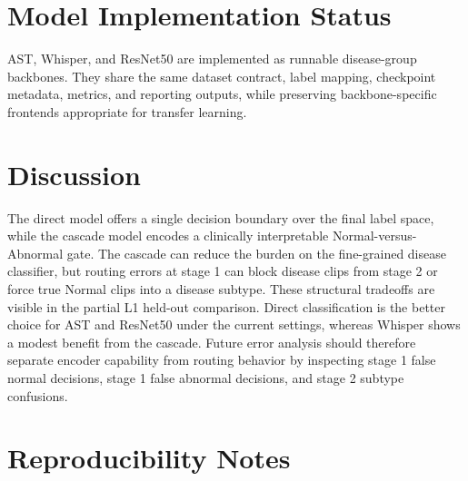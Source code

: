 \documentclass[11pt]{article}
\begin{document}
\section{Model Implementation Status}

AST, Whisper, and ResNet50 are implemented as runnable disease-group backbones.
They share the same dataset contract, label mapping, checkpoint metadata,
metrics, and reporting outputs, while preserving backbone-specific frontends
appropriate for transfer learning.

\section{Discussion}

The direct model offers a single decision boundary over the final label space,
while the cascade model encodes a clinically interpretable Normal-versus-
Abnormal gate. The cascade can reduce the burden on the fine-grained disease
classifier, but routing errors at stage 1 can block disease clips from stage 2
or force true Normal clips into a disease subtype. These structural tradeoffs
are visible in the partial L1 held-out comparison. Direct classification is the
better choice for AST and ResNet50 under the current settings, whereas Whisper
shows a modest benefit from the cascade. Future error analysis should therefore
separate encoder capability from routing behavior by inspecting stage 1 false
normal decisions, stage 1 false abnormal decisions, and stage 2 subtype
confusions.

\section{Reproducibility Notes}
\end{document}
